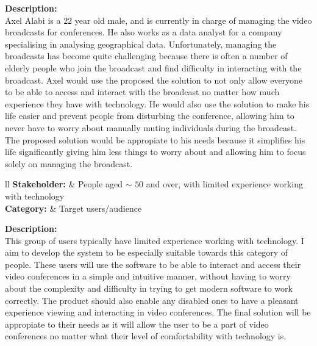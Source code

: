 \textbf{Description:} \\ 

Axel Alabi is a $22$ year old male, and is currently in charge 
of managing the video broadcasts for conferences.
He also works as a data analyst for a company specialising in
analysing geographical data. Unfortunately, managing the
broadcasts has become quite challenging because there is
often a number of elderly people who join the broadcast and
find difficulty in interacting with the broadcast. Axel would 
use the proposed the solution to not only allow everyone to be
able to access and interact with the broadcast no matter how 
much experience they have with technology. He would also use 
the solution to make his life easier and prevent people from 
disturbing the conference, allowing him to never have to worry
about manually muting individuals during the broadcast. The 
proposed solution would be appropiate to his needs because it 
simplifies his life significantly giving him less things to 
worry about and allowing him to focus solely on managing the 
broadcast. \vspace{0.2cm}

\noindent
\begin{tblr}{ll}
  \textbf{Stakeholder: } & {People aged $\sim$ 
  \hspace{-0.2cm} $50$ and over, with limited experience
  working with technology}\\
  \textbf{Category: } & Target users/audience\\
\end{tblr}
\vspace{0.2cm}

\textbf{Description: } \\

This group of users typically have limited experience working 
with technology. I aim to develop the system to be especially
suitable towards this category of people. These users will use
the software to be able to interact and access their video 
conferences in a simple and intuitive manner, without having 
to worry about the complexity and difficulty in trying to get
modern software to work correctly. The product should also 
enable any disabled ones to have a pleasant experience viewing
and interacting in video conferences. The final solution will
be appropiate to their needs as it will allow the user to be a 
part of video conferences no matter what their level of
comfortability with technology is. \vspace{0.2cm}

